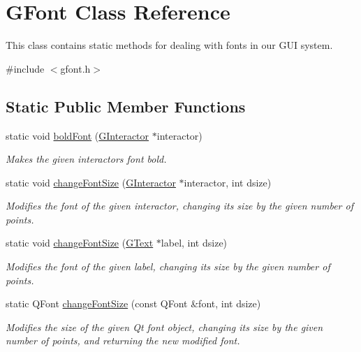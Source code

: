 \hypertarget{classGFont}{}\section{G\+Font Class Reference}
\label{classGFont}


This class contains static methods for dealing with fonts in our G\+UI system.  




{\ttfamily \#include $<$gfont.\+h$>$}

\subsection*{Static Public Member Functions}
\begin{DoxyCompactItemize}
\item 
static void \mbox{\hyperlink{classGFont_ae709c4560c613217490269d4df94602c}{bold\+Font}} (\mbox{\hyperlink{classGInteractor}{G\+Interactor}} $\ast$interactor)
\begin{DoxyCompactList}\small\item\em Makes the given interactor\textquotesingle{}s font bold. \end{DoxyCompactList}\item 
static void \mbox{\hyperlink{classGFont_ae6714d087455b3431d6dce6f1202659f}{change\+Font\+Size}} (\mbox{\hyperlink{classGInteractor}{G\+Interactor}} $\ast$interactor, int dsize)
\begin{DoxyCompactList}\small\item\em Modifies the font of the given interactor, changing its size by the given number of points. \end{DoxyCompactList}\item 
static void \mbox{\hyperlink{classGFont_a8efb627bfbb3c5dddb8453dd8668880a}{change\+Font\+Size}} (\mbox{\hyperlink{classGText}{G\+Text}} $\ast$label, int dsize)
\begin{DoxyCompactList}\small\item\em Modifies the font of the given label, changing its size by the given number of points. \end{DoxyCompactList}\item 
static Q\+Font \mbox{\hyperlink{classGFont_a1f55c64940d99e62528d5bfc634123f8}{change\+Font\+Size}} (const Q\+Font \&font, int dsize)
\begin{DoxyCompactList}\small\item\em Modifies the size of the given Qt font object, changing its size by the given number of points, and returning the new modified font. \end{DoxyCompactList}\item 

\end{DoxyCompactItemize}
